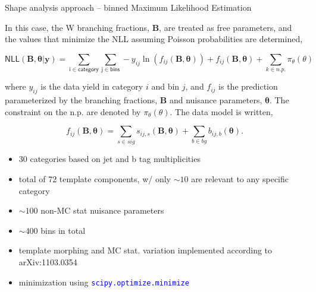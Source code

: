 \begin{frame}{\smaller Shape analysis approach -- binned Maximum Likelihood Estimation}

    \begin{tcolorbox}[]{}
        \smaller\smaller 
        In this case, the W branching fractions, $\mathbf{B}$, are
        treated as free parameters, and the values that minimize the NLL
        assuming Poisson probabilities are determined,

        \begin{equation}
            \nonumber
            \mathsf{NLL}(\boldsymbol{B}, \boldsymbol{\theta}|\mathbf{y}) = \sum_{\mathsf{i\in category}} 
            \sum_{\mathsf{j \in bins}} -y_{ij}\ln(f_{ij}(\boldsymbol{B},
            \boldsymbol{\theta})) + f_{ij}(\boldsymbol{B}, \boldsymbol{\theta}) + \sum_{k\in
            n.p.}\pi_\theta (\theta)
        \end{equation}

        where $y_{ij}$ is the data yield in category $i$ and bin $j$, and $f_{ij}$ is the prediction
        parameterized by the branching fractions, $\mathbf{B}$ and nuisance parameters,
        $\boldsymbol{\theta}$. The constraint on the n.p. are denoted by $\pi_{\theta}(\theta)$. The
        data model is written, 

        \begin{equation}
            \nonumber
            f_{ij}(\boldsymbol{B}, \boldsymbol{\theta}) =
            \sum_{s\in sig} s_{ij,s}(\boldsymbol{B}, \boldsymbol{\theta}) + \sum_{b\in bg}
            b_{ij,b}(\boldsymbol{\theta}). 
        \end{equation}

    \end{tcolorbox}

        \begin{itemize}
            \smaller\smaller
            \item 30 categories based on jet and b tag multiplicities 
            \item total of 72 template components, w/ only $\sim 10$ are
                relevant to any specific category
            \item $\sim 100$ non-MC stat nuisance parameters
            \item $\sim 400$ bins in total 
            \item template morphing and MC stat. variation implemented according to arXiv:1103.0354
            \item minimization using \textcolor{blue}{\texttt{scipy.optimize.minimize}}
        \end{itemize}
    
\end{frame}



